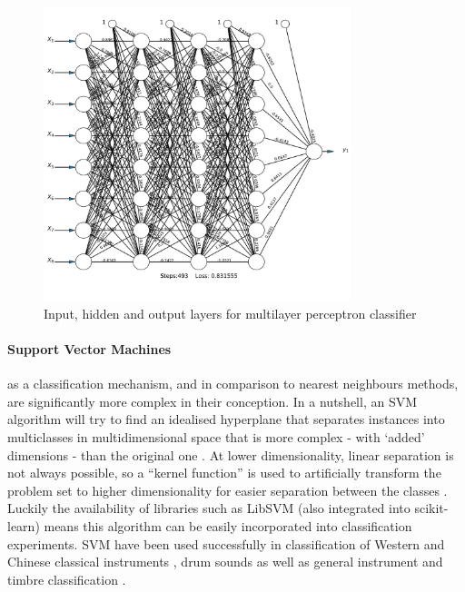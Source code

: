 {{{{\begin{figure}
	\begin{center}
		\includegraphics[width=0.8\textwidth]{ch05_pyconcat/figures/neural_network.pdf}
	\end{center}
	\caption[Input, hidden and output layers for multilayer perceptron classifier]{Input, hidden and output layers for multilayer perceptron classifier}
	\label{fig:neural_net}
\end{figure}

\paragraph{Support Vector Machines} 

 as a classification mechanism, and in comparison to nearest neighbours methods, are significantly more complex in their conception. In a nutshell, an SVM algorithm will try to find an idealised hyperplane that separates instances into multiclasses in multidimensional space that is more complex - with `added' dimensions - than the original one \citep{Chang2008}. At lower dimensionality, linear separation is not always possible, so a ``kernel function'' is used to artificially transform the problem set to higher dimensionality for easier separation between the classes \citep{Xu2003}. Luckily the availability of libraries such as LibSVM \citep{Chang2011} (also integrated into scikit-learn) means this algorithm can be easily incorporated into classification experiments. SVM have been used successfully in classification of Western and Chinese classical instruments \citep{Liu2010a}, drum sounds \citep{Herrera2002, Herrera2003} as well as general instrument and timbre classification \citep{Herrera-Boyer2003, Krey2010, Agostini2003, Deng2008}.

}}}}
